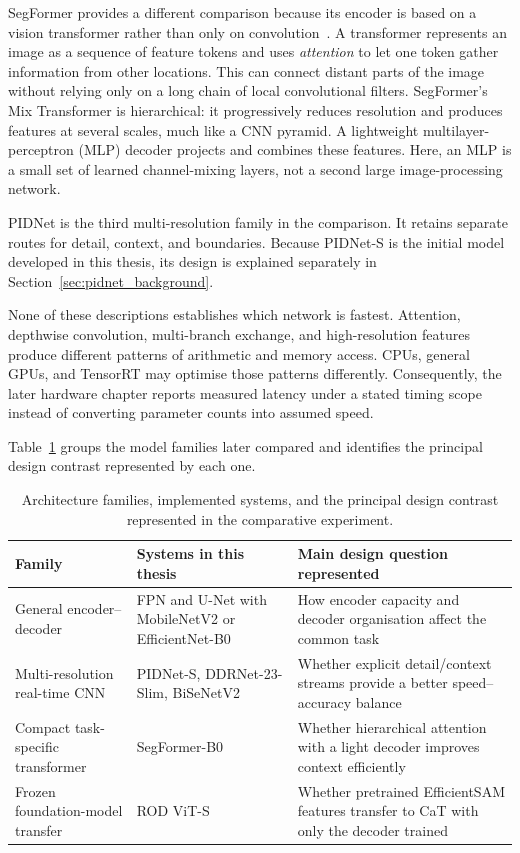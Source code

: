SegFormer provides a different comparison because its encoder is based on a
vision transformer rather than only on convolution~\cite{xie2021segformer}.
A transformer represents an image as a sequence of feature tokens and uses
\emph{attention} to let one token gather information from other locations.
This can connect distant parts of the image without relying only on a long
chain of local convolutional filters. SegFormer's Mix Transformer is
hierarchical: it progressively reduces resolution and produces features at
several scales, much like a CNN pyramid. A lightweight multilayer-perceptron
(MLP) decoder projects and combines these features. Here, an MLP is a small
set of learned channel-mixing layers, not a second large image-processing
network.

PIDNet is the third multi-resolution family in the comparison. It retains
separate routes for detail, context, and boundaries. Because PIDNet-S is the
initial model developed in this thesis, its design is explained separately in
Section~\ref{sec:pidnet_background}.

None of these descriptions establishes which network is fastest. Attention,
depthwise convolution, multi-branch exchange, and high-resolution features
produce different patterns of arithmetic and memory access. CPUs, general
GPUs, and TensorRT may optimise those patterns differently. Consequently, the
later hardware chapter reports measured latency under a stated timing scope
instead of converting parameter counts into assumed speed.

Table~\ref{tab:architecture_families} groups the model families later compared
and identifies the principal design contrast represented by each one.

\begin{table}[H]
\centering
\caption{Architecture families, implemented systems, and the principal design
contrast represented in the comparative experiment.}
\label{tab:architecture_families}
\small
\begin{tabularx}{\textwidth}{@{}
  >{\raggedright\arraybackslash}p{}
  >{\raggedright\arraybackslash}p{}
  >{\raggedright\arraybackslash}X@{}}
\toprule
\textbf{Family} & \textbf{Systems in this thesis} & \textbf{Main design question represented} \\
\midrule
General encoder--decoder & FPN and U-Net with MobileNetV2 or EfficientNet-B0 & How encoder capacity and decoder organisation affect the common task \\
Multi-resolution real-time CNN & PIDNet-S, DDRNet-23-Slim, BiSeNetV2 & Whether explicit detail/context streams provide a better speed--accuracy balance \\
Compact task-specific transformer & SegFormer-B0 & Whether hierarchical attention with a light decoder improves context efficiently \\
Frozen foundation-model transfer & ROD ViT-S & Whether pretrained EfficientSAM features transfer to CaT with only the decoder trained \\
\bottomrule
\end{tabularx}
\end{table}


